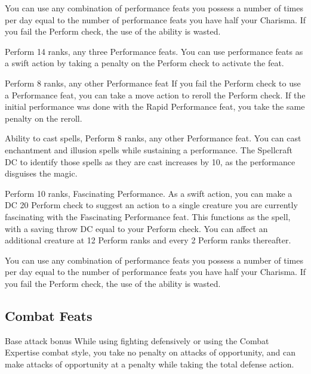 You can use any combination of performance feats you possess a number of times per day equal to the number of performance feats you have \add half your Charisma. If you fail the Perform check, the use of the ability is wasted.

\featpre Perform 14 ranks, any three Performance feats.
\featben You can use performance feats as a swift action by taking a  penalty on the Perform check to activate the feat.

\featpre Perform 8 ranks, any other Performance feat
\featben If you fail the Perform check to use a Performance feat, you can take a move action to reroll the Perform check. If the initial performance was done with the Rapid Performance feat, you take the same  penalty on the reroll.

\featpre Ability to cast spells, Perform 8 ranks, any other Performance feat.
\featben You can cast enchantment and illusion spells while sustaining a performance. The Spellcraft DC to identify those spells as they are cast increases by 10, as the performance disguises the magic.

\featpre Perform 10 ranks, Fascinating Performance.
\featben As a swift action, you can make a DC 20 Perform check to suggest an action to a single creature you are currently fascinating with the Fascinating Performance feat. This functions as the  spell, with a saving throw DC equal to your Perform check. You can affect an additional creature at 12 Perform ranks and every 2 Perform ranks thereafter.

You can use any combination of performance feats you possess a number of times per day equal to the number of performance feats you have \add half your Charisma. If you fail the Perform check, the use of the ability is wasted.

\subsection{Combat Feats}

 Base attack bonus 
 While using fighting defensively or using the Combat Expertise combat style, you take no penalty on attacks of opportunity, and can make attacks of opportunity at a  penalty while taking the total defense action.

